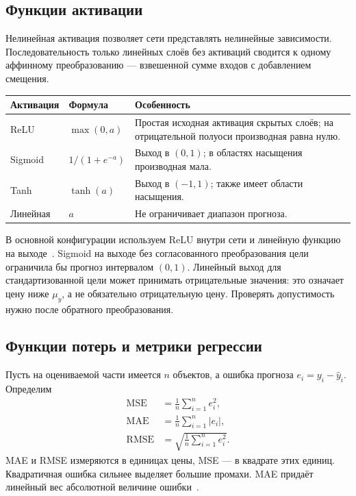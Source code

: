 \subsection{Функции активации}
Нелинейная активация позволяет сети представлять нелинейные зависимости.
Последовательность только линейных слоёв без активаций сводится к одному
аффинному преобразованию --- взвешенной сумме входов с добавлением смещения.

\noindent\begin{tabularx}{\textwidth}{@{}p{}p{}Y@{}}
\toprule
Активация & Формула & Особенность \\
\midrule
ReLU & \(\max(0,a)\) & Простая исходная активация скрытых слоёв;
на отрицательной полуоси производная равна нулю. \\
Sigmoid & \(1/(1+e^{-a})\) & Выход в \((0,1)\); в областях насыщения
производная мала. \\
Tanh & \(\tanh(a)\) & Выход в \((-1,1)\); также имеет области насыщения. \\
Линейная & \(a\) & Не ограничивает диапазон прогноза. \\
\bottomrule
\end{tabularx}

В основной конфигурации используем ReLU внутри сети и линейную функцию
на выходе~\cite{activations}. Sigmoid на выходе без согласованного
преобразования цели ограничила бы прогноз интервалом \((0,1)\).
Линейный выход для стандартизованной цели может принимать отрицательные
значения: это означает цену ниже \(\mu_y\), а не обязательно отрицательную
цену. Проверять допустимость нужно после обратного преобразования.

\subsection{Функции потерь и метрики регрессии}
Пусть на оцениваемой части имеется \(n\) объектов, а ошибка прогноза
\(e_i=y_i-\widehat y_i\). Определим
\begin{align}
\operatorname{MSE}&=\frac1n\sum_{i=1}^{n}e_i^2,\\
\operatorname{MAE}&=\frac1n\sum_{i=1}^{n}|e_i|,\\
\operatorname{RMSE}&=\sqrt{\frac1n\sum_{i=1}^{n}e_i^2}.
\end{align}
MAE и RMSE измеряются в единицах цены, MSE --- в квадрате этих единиц.
Квадратичная ошибка сильнее выделяет большие промахи. MAE придаёт
линейный вес абсолютной величине ошибки~\cite{losses}.

